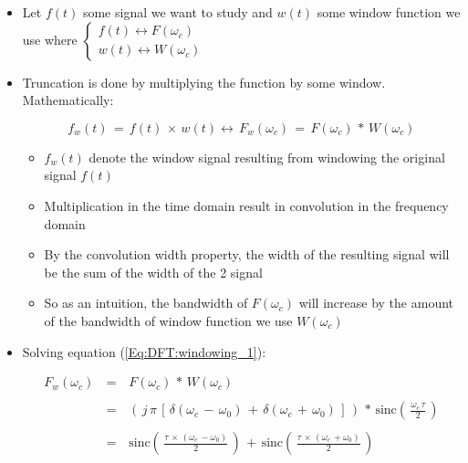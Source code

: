 \documentclass[12pt,a4paper]{book}
\begin{document}
\begin{itemize}

\item Let $f(t)$ some signal we want to study and $w(t)$ some window function we use where $\begin{cases}
f(t) \leftrightarrow F(\omega_c) \\
w(t) \leftrightarrow W(\omega_c) 
\end{cases}$

\item Truncation is done by multiplying the function by some window. Mathematically: 


\begin{equation}
f_w(t) \, = \, f(t) \, \times \, w(t) \leftrightarrow \, F_w(\omega_c) \, = \, F(\omega_c) \, * \, W(\omega_c)
\label{Eq:DFT:windowing_1} 
\end{equation}

	\begin{itemize}
	
	\item $f_w(t)$ denote the window signal resulting from windowing the original signal $f(t)$
	
	\item Multiplication in the time domain result in convolution in the frequency domain
	
	\item By the convolution width property, the width of the resulting signal will be the sum of the width of the 2 signal
	
	\item So as an intuition, the bandwidth of $F(\omega_c)$ will increase by the amount of the bandwidth of window function we use $W(\omega_c)$
	\end{itemize}



\item Solving equation (\ref{Eq:DFT:windowing_1}):

\begin{equation}
\begin{array}{rcl}
F_w(\omega_c) \, &=& \, F(\omega_c) \, * \, W(\omega_c) \\ \\
				 &=& \, \left(\, j\,\pi \, \left[\, \delta(\omega_c \,- \, \omega_0) \, + \, \delta(\omega_c \,+ \, \omega_0)  \,\right]   \,\right) \, * \, \text{sinc} \left(\,\displaystyle\frac{\omega_c \, \tau}{2} \, \right) \\ \\
				&=& \, \text{sinc} \left(\,\displaystyle\frac{ \tau \, \times \, (\omega_c \, - \omega_0) }{2} \, \right) \, + \, \text{sinc} \left(\,\displaystyle\frac{ \tau \, \times \, (\omega_c \, + \omega_0) }{2} \, \right) 
\end{array}
\label{Eq:DFT:windowing_2}
\end{equation}


\end{itemize}
\end{document}
